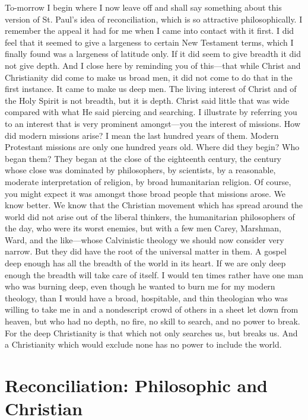 \documentclass[draft]{ptfdoc}
\begin{document}
To-morrow I begin where I now leave off 
and shall say something about this version of 
St. Paul's idea of reconciliation, which is so 
attractive philosophically. I remember the 
appeal it had for me when I came into contact 
with it first. I did feel that it seemed to give 
a largeness to certain New Testament terms, 
which I finally found was a largeness of latitude 
only. If it did seem to give breadth it 
did not give depth. And I close here by reminding 
you of this---that while Christ and 
Christianity did come to make us broad men, 
it did not come to do that in the first instance. 
It came to make us deep men. The living 
interest of Christ and of the Holy Spirit is not 
breadth, but it is depth. Christ said little 
that was wide compared with what He said 
piercing and searching. I illustrate by referring 
you to an interest that is very prominent 
amongst---you the interest of missions. How 
did modern missions arise? I mean the last 
hundred years of them. Modern Protestant 
missions are only one hundred years old. 
Where did they begin? Who began them? 
They began at the close of the eighteenth 
century, the century whose close was dominated 
by philosophers, by scientists, by a 
reasonable, moderate interpretation of religion, 
by broad humanitarian religion. Of course, 
you might expect it was amongst those broad 
people that missions arose. We know better. 
We know that the Christian movement which 
has spread around the world did not arise out 
of the liberal thinkers, the humanitarian philosophers 
of the day, who were its worst enemies, 
but with a few men Carey, Marshman, Ward,
and the like---whose Calvinistic theology we 
should now consider very narrow. But they did 
have the root of the universal matter in them. 
A gospel deep enough has all the breadth of the 
world in its heart. If we are only deep enough 
the breadth will take care of itself. I would 
ten times rather have one man who was burning 
deep, even though he wanted to burn me 
for my modern theology, than I would have a 
broad, hospitable, and thin theologian who was 
willing to take me in and a nondescript crowd 
of others in a sheet let down from heaven, 
but who had no depth, no fire, no skill to 
search, and no power to break. For the deep 
Christianity is that which not only searches 
us, but breaks us. And a Christianity which 
would exclude none has no power to include 
the world. 


\chapter{Reconciliation: Philosophic and Christian}
\end{document}
